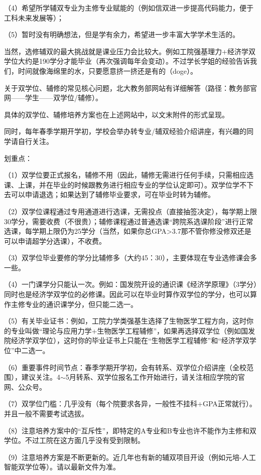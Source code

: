 \documentclass[11pt,oneside]{book}
\begin{document}
（4）希望所学辅双专业为主修专业赋能的（例如信双进一步提高代码能力，便于工科未来发展等）；

（5）暂时没有明确想法，但是学有余力，希望进一步丰富大学学术生活的。

当然，选修辅双的最大挑战就是课业压力会比较大。例如工院强基理力+经济学双学位大约是190学分才能毕业（再次强调每年会变动）。不过学长学姐的经验告诉我们，时间就像海绵里的水，只要愿意挤一挤还是有的（doge）。

关于双学位、辅修的常见核心问题，北大教务部网站有详细解答（路径：教务部官网——学生——双学位/辅修）。

具体的双学位、辅修培养方案也在上述网站中，以文末附件的形式呈现。

同时，每年春季学期开学初，学校会举办转专业/辅双经验介绍讲座，有兴趣的同学请自行关注。

划重点：

（1）双学位要正式报名，辅修不用（因此，辅修无需进行任何手续，只需相应选课、上课，并在毕业的时候跟教务进行相应专业的学位认定即可）。双学位学不下去可以申请退选；如果达到了辅修毕业要求，可在毕业时转为辅修。

（2）双学位课程通过专用通道进行选课，无需投点（直接抽签决定），每学期上限30学分，需要收费（不很贵）；辅修课程通过普通选课“跨院系选课阶段”进行正常选课，每学期上限仍为25学分（当然，如果你总GPA>3.7那不管你修没修双还是可以申请超学分选课），不收费。

（3）双学位毕业要修的学分比辅修多（大约45：30），主要体现在专业选修课会多一些。

（4）一门课学分只能认一次。例如：国发院开设的通识课《经济学原理》（3学分）同时也是经济学双学位的必修课。因此可以在毕业时算作双学位的学分，也可以算作主修专业的通识课学分，但只能二选一。

（5）有关毕业证书：例如，工院力学类强基生选择了生物医学工程方向，这时你的专业叫做“理论与应用力学+生物医学工程辅修”，如果再选择双学位（例如国发院经济学双学位），这时你的毕业证书上只能在“生物医学工程辅修”和“经济学双学位”中二选一。

（6）重要事件时间节点：春季学期开学初，会有转系、双学位介绍讲座（全校范围），建议关注。4$\sim$5月转系、双学位报名工作开始进行，请关注相应学院的官网、公众号。

（7）双学位门槛：几乎没有（每个院要求各异，一般性不挂科+GPA正常就行）。并且一般不需要考试选拔。

（8）注意培养方案中的“互斥性”，即特定的A专业和B专业也许不能作为主修和双学位。不过工院在这方面几乎没有受到限制。

（9）注意培养方案是不断更新的。近几年也有新的辅双项目开设（例如元培-人工智能双学位等）。请以最新文件为准。
\end{document}
